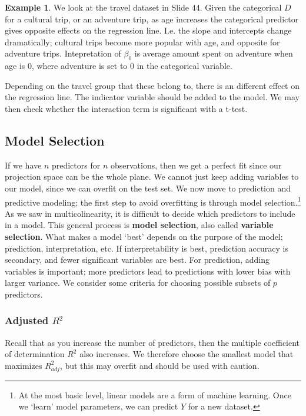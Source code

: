 \documentclass[12pt, a4paper]{article}
\theoremstyle{definition}
\newtheorem{example}{Example}
\begin{document}
	\begin{example}
		We look at the travel dataset in Slide 44. Given the categorical $D$ for a cultural trip, or an adventure trip, as age increases the categorical predictor gives opposite effects on the regression line. I.e. the slope and intercepts change dramatically; cultural trips become more popular with age, and opposite for adventure trips. Intepretation of $\beta_0$ is average amount spent on adventure when age is $0$, where adventure is set to $0$ in the categorical variable.
	\end{example}

	Depending on the travel group that these belong to, there is an different effect on the regression line. The indicator variable should be added to the model. We may then check whether the interaction term is significant with a t-test. 
	
	\subsection{Model Selection}
	
	If we have $n$ predictors for $n$ observations, then we get a perfect fit since our projection space can be the whole plane. We cannot just keep adding variables to our model, since we can overfit on the test set. We now move to prediction and predictive modeling; the first step to avoid overfitting is through model selection.\footnote{At the most basic level, linear models are a form of machine learning. Once we `learn' model parameters, we can predict $Y$ for a new dataset.}\\
	
	As we saw in multicolinearity, it is difficult to decide which predictors to include in a model. This general process is {\bf model selection}, also called {\bf variable selection}. What makes a model `best' depends on the purpose of the model; prediction, interpretation, etc. If interpretability is best, prediction accuracy is secondary, and fewer significant variables are best. For prediction, adding variables is important; more predictors lead to predictions with lower bias with larger variance. We consider some criteria for choosing possible subsets of $p$ predictors.
	
	\subsubsection{Adjusted $R^2$}
	
	Recall that as you increase the number of predictors, then the multiple coefficient of determination $R^2$ also increases. We therefore choose the smallest model that maximizes $R^2_{adj}$, but this may overfit and should be used with caution.
	
\end{document}
